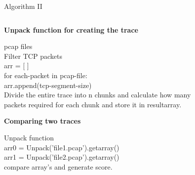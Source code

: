 \documentclass{beamer}
\begin{document}
\begin{frame}{Algorithm II}
    \begin{columns}
        \begin{column}{0.5\textwidth}
            \begin{algorithm}
                \scriptsize
                \hline
                \caption{\textbf{Unpack function for creating the trace}}\label{alg:cap}
                \hline
                \begin{algorithmic}
                \Require pcap files
                \\
                  \hspace{1em} Filter TCP packets \\
                  \hspace{1em} arr = [ ] \\ 
                  \hspace{1em} for each-packet in pcap-file: \\
                  \hspace{2em} arr.append(tcp-segment-size) \\
                  \hspace{1em} Divide the entire trace into n chunks and calculate how many \\
                  \hspace{1em} packets required for each chunk and store it in resultarray.
                \end{algorithmic}
            \end{algorithm}
            \hline
            \begin{algorithm}
                \scriptsize
                \hline
                \caption{\textbf{Comparing two traces}}\label{alg:cap}
                \hline
                \begin{algorithmic}
                \Require Unpack function
                \\
                    \hspace{1em} arr0 = Unpack('file1.pcap').getarray() \\
                    \hspace{1em} arr1 = Unpack('file2.pcap').getarray() \\
                    \hspace{1em} compare array's and generate score.

\end{algorithmic}
\end{algorithm}
\end{column}
\end{columns}
\end{frame}
\end{document}
